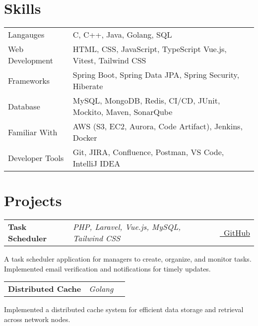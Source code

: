 \documentclass[a4paper,10pt]{article}
\makeatletter
\newenvironment{jobshort}[3]
    {
    \begin{tabularx}{\linewidth}{@{}l X r@{}}
    \textbf{#1} & \textit{#2} &  #3 \\[3pt]
    \end{tabularx}
    }
    {
    }
\makeatother
\begin{document}
\section{Skills}
\vspace{-4pt}
\begin{tabularx}{\linewidth}{@{}l X@{}}
Langauges &  \normalsize{C, C++, Java, Golang, SQL}\\
Web Development & \normalsize{HTML, CSS, JavaScript, TypeScript Vue.js, Vitest, Tailwind CSS}\\
Frameworks &  \normalsize{Spring Boot, Spring Data JPA, Spring Security, Hiberate}\\
Database & \normalsize{MySQL, MongoDB, Redis, CI/CD, JUnit, Mockito, Maven, SonarQube}\\
Familiar With & \normalsize{AWS (S3, EC2, Aurora, Code Artifact), Jenkins, Docker}\\
Developer Tools & \normalsize{Git, JIRA, Confluence, Postman, VS Code, IntelliJ IDEA}\\
\end{tabularx}



  
\section{Projects}
\vspace{-4pt}
\begin{jobshort}{Task Scheduler}{PHP, Laravel, Vue.js, MySQL, Tailwind CSS}{\href{https://github.com/sagnik6969/task_scheduler_frontend}{\raisebox{-0.05\height}\faGithub\ GitHub}}
    A task scheduler application for managers to create, organize, and monitor tasks. Implemented email verification and
notifications for timely updates.
\end{jobshort}

\begin{jobshort}{Distributed Cache}{Golang}{}
    Implemented a distributed cache system for efficient data storage and retrieval across network nodes.
\end{jobshort}

\end{document}
